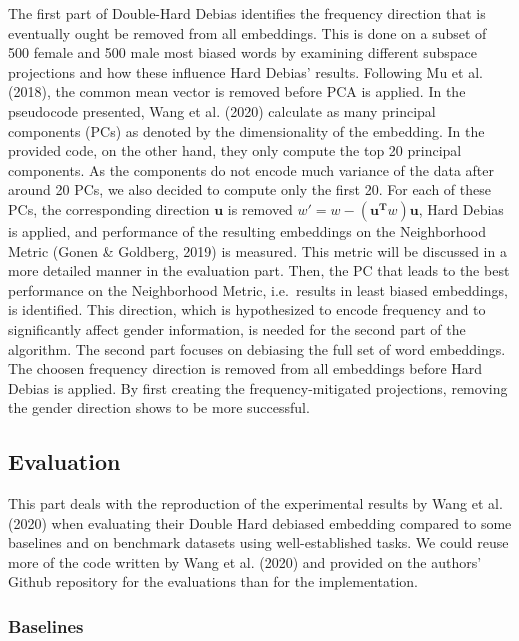 \documentclass[
  english,
  man,floatsintext]{apa6}
\begin{document}
The first part of Double-Hard Debias identifies the frequency direction that is eventually ought be removed from all embeddings. This is done on a subset of 500 female and 500 male most biased words by examining different subspace projections and how these influence Hard Debias' results. Following Mu et al. (2018), the common mean vector is removed before PCA is applied. In the pseudocode presented, Wang et al. (2020) calculate as many principal components (PCs) as denoted by the dimensionality of the embedding. In the provided code, on the other hand, they only compute the top 20 principal components. As the components do not encode much variance of the data after around 20 PCs, we also decided to compute only the first 20.
For each of these PCs, the corresponding direction \(\mathbf{u}\) is removed \(w' = w - (\mathbf{u^{T}}w)\mathbf{u}\), Hard Debias is applied, and performance of the resulting embeddings on the Neighborhood Metric (Gonen \& Goldberg, 2019) is measured. This metric will be discussed in a more detailed manner in the evaluation part. Then, the PC that leads to the best performance on the Neighborhood Metric, i.e.~results in least biased embeddings, is identified. This direction, which is hypothesized to encode frequency and to significantly affect gender information, is needed for the second part of the algorithm.
The second part focuses on debiasing the full set of word embeddings. The choosen frequency direction is removed from all embeddings before Hard Debias is applied. By first creating the frequency-mitigated projections, removing the gender direction shows to be more successful.

\hypertarget{evaluation}{%
\subsection{Evaluation}\label{evaluation}}

This part deals with the reproduction of the experimental results by Wang et al. (2020) when evaluating their Double Hard debiased embedding compared to some baselines and on benchmark datasets using well-established tasks. We could reuse more of the code written by Wang et al. (2020) and provided on the authors' Github repository for the evaluations than for the implementation.

\hypertarget{baselines}{%
\subsubsection{Baselines}\label{baselines}}
\end{document}

